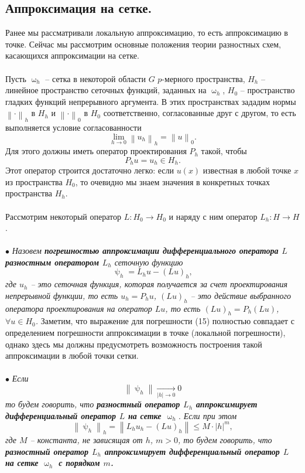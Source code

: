 \documentclass[a4paper, 12pt]{report}
\numberwithin{equation}{section}
\renewcommand{\leq}{\leqslant}
\renewcommand{\psi}{\uppsi}
\renewcommand{\omega}{\upomega}
\newcommand\Norm[1]{\left\| #1 \right\|}
\begin{document}
\subsection{Аппроксимация на сетке.}
Ранее мы рассматривали локальную аппроксимацию, то есть аппроксимацию в точке. Сейчас мы рассмотрим основные положения теории разностных схем, касающихся аппроксимации на сетке.\\\\
Пусть $\omega_h$ -- сетка в некоторой области $G$ $p$-мерного пространства, $H_h$ -- линейное пространство сеточных функций, заданных на $\omega_h$, $H_0$ -- пространство гладких функций непрерывного аргумента. В этих пространствах зададим нормы $\Norm{\cdot}_h$ в $H_h$ и $\Norm{\cdot}_0$ в $H_0$ соответственно, согласованные друг с другом, то есть выполняется условие согласованности
$$\lim\limits_{h\to 0}\Norm{u_h}_h = \Norm{u}_0.$$
Для этого должны иметь оператор проектирования $P_h$ такой, чтобы $$P_hu = u_h \in H_h.$$
Этот оператор строится достаточно легко: если $u(x)$ известная в любой точке $x$ из пространства $H_0$, то очевидно мы знаем значения в конкретных точках пространства $H_h$.\\\\
Рассмотрим некоторый оператор $L: H_0 \to H_0$ и наряду с ним оператор $L_h : H \to H$.\\\\
$\bullet$ \textit{Назовем \textbf{погрешностью аппроксимации дифференциального оператора $L$ разностным оператором $L_h$} сеточную функцию}
\begin{equation}
	\psi_h = L_hu - (Lu)_h,
\end{equation}
\textit{где $u_h$ -- это сеточная функция, которая получается за счет проектирования непрерывной функции, то есть $u_h = P_hu$, $(Lu)_h$ -- это действие выбранного оператора проектирования на оператор $Lu$, то есть $(Lu)_h = P_h(Lu)$, $\forall u \in H_0$.	}
Заметим, что выражение для погрешности (15) полностью совпадает с определением погрешности аппроксимации в точке (локальной погрешности), однако здесь мы должны предусмотреть возможность построения такой аппроксимации в любой точки сетки.\\\\
$\bullet$ \textit{Если $$\Norm{\psi_h}\xrightarrow[|h|\to 0]{}0$$ то будем говорить, что \textbf{разностный оператор $L_h$ аппроксимирует дифференциальный оператор $L$ на сетке $\omega_h$}. Если при этом \begin{equation}
		\Norm{\psi_h}_h = \Norm{L_hu_h - (Lu)_h} \leq M \cdot |h|^m,
	\end{equation} где $M$ -- константа, не зависящая от $h$, $m>0$, то будем говорить, что \textbf{разностный оператор $L_h$ аппроксимирует дифференциальный оператор $L$ на сетке $\omega_h$ с порядком $m$.}}
\end{document}
